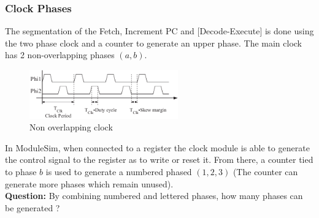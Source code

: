 \documentclass[a4paper, 11pt]{article}
\begin{document}
\subsubsection{Clock Phases}
The segmentation of the Fetch, Increment PC and [Decode-Execute] is done using the two phase clock and a counter to generate an upper phase.
The main clock has 2 non-overlapping phases $(a,b)$. 
\begin{figure}[H]
    \centering
    \includegraphics[width =0.57\textwidth]{Images/The-non-overlapping-two-phase-clocking-scheme.png}
    \caption{Non overlapping clock}
    \label{fig:nonoverclk}
    \end{figure}
In ModuleSim, when connected to a register the clock module is able to generate the control signal to the register as to write or reset it. From there, a counter tied to phase $b$ is used to generate a numbered phased $(1,2,3)$ (The counter can generate more phases which remain unused). \\
\textbf{Question:} By combining numbered and lettered phases, how many phases can be generated ? \\
\end{document}
